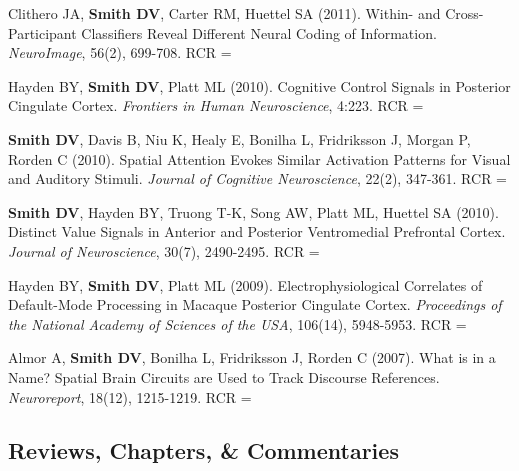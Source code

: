 \documentclass[11pt, letterpaper]{article}
\newcommand{\years}[1]{\marginnote{\scriptsize #1}}
\begin{document}
\begin{hangparas}{.5in}{1}
\years{6.}Clithero JA, \textbf{Smith DV}, Carter RM, Huettel SA (2011). Within- and Cross-Participant Classifiers Reveal Different Neural Coding of Information. \textit{NeuroImage}, 56(2), 699-708. RCR = 

\years{5.}Hayden BY, \textbf{Smith DV}, Platt ML (2010). Cognitive Control Signals in Posterior Cingulate Cortex. \textit{Frontiers in Human Neuroscience}, 4:223. RCR = 

\years{4.}\textbf{Smith DV}, Davis B, Niu K, Healy E, Bonilha L, Fridriksson J, Morgan P, Rorden C (2010). Spatial Attention Evokes Similar Activation Patterns for Visual and Auditory Stimuli. \textit{Journal of Cognitive Neuroscience}, 22(2), 347-361. RCR = 

\years{3.}\textbf{Smith DV}, Hayden BY, Truong T-K, Song AW, Platt ML, Huettel SA (2010). Distinct Value Signals in Anterior and Posterior Ventromedial Prefrontal Cortex. \textit{Journal of Neuroscience}, 30(7), 2490-2495. RCR = 

\years{2.}Hayden BY, \textbf{Smith DV}, Platt ML (2009). Electrophysiological Correlates of Default-Mode Processing in Macaque Posterior Cingulate Cortex. \textit{Proceedings of the National Academy of Sciences of the USA}, 106(14), 5948-5953. RCR = 

\years{1.} Almor A, \textbf{Smith DV}, Bonilha L, Fridriksson J, Rorden C (2007). What is in a Name? Spatial Brain Circuits are Used to Track Discourse References. \textit{Neuroreport}, 18(12), 1215-1219. RCR =  \\ [.5cm]

\end{hangparas}


\subsection*{Reviews, Chapters, \& Commentaries}
\end{document}
